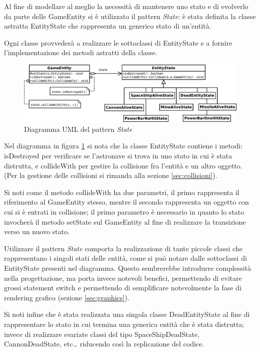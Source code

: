 \documentclass[a4paper,12pt]{article}
\begin{document}
Al fine di modellare al meglio la necessit\`a di mantenere uno stato e di evolverlo da parte delle \textsf{GameEntity} si \`e utilizzato il pattern \emph{State}: \`e stata definita la classe astratta \textsf{EntityState} che rappresenta un generico stato di un'entit\`a.

Ogni classe provveder\`a a realizzare le sottoclassi di \textsf{EntityState} e a fornire l'implementazione dei metodi astratti della classe.

\begin{figure}[h]
\centering
\includegraphics[width=15cm]{State.pdf}
\caption{Diagramma UML del pattern \emph{State}}
\label{img:State}
\end{figure}

Nel diagramma in figura \ref{img:State} si nota che la classe \textsf{EntityState} contiene i metodi: \textsf{isDestroyed} per verificare se l'astronave si trova in uno stato in cui \`e stata distrutta, e \textsf{collideWith} per gestire la collisione fra l'entit\`a e un altro oggetto. (Per la gestione delle collisioni si rimanda alla sezione \ref{sec:collisioni}).

Si noti come il metodo \textsf{collideWith} ha due parametri, il primo rappresenta il riferimento al \textsf{GameEntity} stesso, mentre il secondo rappresenta un oggetto con cui si \`e entrati in collisione; il primo parametro \`e necessario in quanto lo stato invocher\`a il metodo \textsf{setState} sul \textsf{GameEntity} al fine di realizzare la transizione verso un nuovo stato.

Utilizzare il pattern \emph{State} comporta la realizzazione di tante piccole classi che rappresentano i singoli stati delle entit\`a, come si pu\`o notare dalle sottoclassi di \textsf{EntityState} presenti nel diagramma. Questo sembrerebbe introdurre complessit\`a nella progettazione, ma porta invece notevoli benefici, permettendo di evitare grossi statement switch e permettendo di semplificare notevolmente la fase di rendering grafico (sezione \ref{sec:graphics}).

Si noti infine che \`e stata realizzata una singola classe \textsf{DeadEntityState} al fine di rappresentare lo stato in cui termina una generica entit\`a che \`e stata distrutta; invece di realizzare svariate classi del tipo \textsf{SpaceShipDeadState}, \textsf{CannonDeadState}, etc\dots{} riducendo cos\`i la replicazione del codice.
\end{document}
